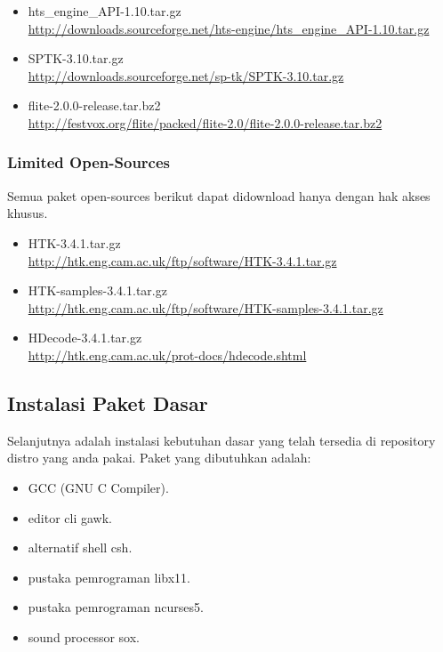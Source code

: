 \documentclass[12pt,]{article}
\begin{document}
\begin{itemize}
		\item hts\_engine\_API-1.10.tar.gz \\
		\url{http://downloads.sourceforge.net/hts-engine/hts_engine_API-1.10.tar.gz}
		
		\item SPTK-3.10.tar.gz \\
		\url{http://downloads.sourceforge.net/sp-tk/SPTK-3.10.tar.gz}

		\item flite-2.0.0-release.tar.bz2 \\
		\url{http://festvox.org/flite/packed/flite-2.0/flite-2.0.0-release.tar.bz2}
	\end{itemize}
	
	\subsubsection{Limited Open-Sources}
	
	Semua paket open-sources berikut dapat didownload hanya dengan hak akses khusus.
	
	\begin{itemize}
		\item HTK-3.4.1.tar.gz \\
		\url{http://htk.eng.cam.ac.uk/ftp/software/HTK-3.4.1.tar.gz}
		
		\item HTK-samples-3.4.1.tar.gz \\
		\url{http://htk.eng.cam.ac.uk/ftp/software/HTK-samples-3.4.1.tar.gz}
		
		\item HDecode-3.4.1.tar.gz \\
		\url{http://htk.eng.cam.ac.uk/prot-docs/hdecode.shtml}
		
		
	\end{itemize}

	\subsection{Instalasi Paket Dasar}
	
	Selanjutnya adalah instalasi kebutuhan dasar yang telah tersedia di repository distro yang anda pakai.
	Paket yang dibutuhkan adalah:
	
	\begin{itemize}
		\item GCC (GNU C Compiler).
		\item editor cli gawk.
		\item alternatif shell csh.
		\item pustaka pemrograman libx11.
		\item pustaka pemrograman ncurses5.
		\item sound processor sox.
	\end{itemize}
\end{document}
